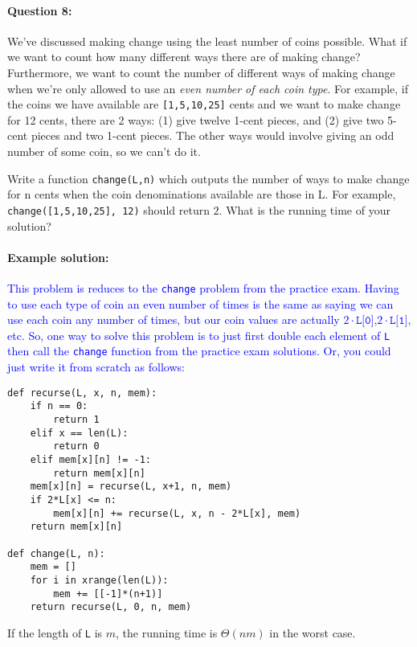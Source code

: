 \documentclass[11pt]{article}
\newcommand{\sol}[1]{\textcolor{blue}{#1}}
\begin{document}
\newpage

\paragraph{Question 8:}
We've discussed making change using the least number of coins
possible.  What if we want to count how many different ways there are
of making change?  
Furthermore, we want to count the number of different ways of making
change when we're only allowed to use an {\em even number of each coin
  type}.
For example, if the coins we have available are
\texttt{[1,5,10,25]} cents and we want to make change for 12 cents, there are 2
ways: (1) give twelve 1-cent pieces,  and (2) give two 5-cent pieces and
two 1-cent pieces.  The other ways would involve giving an odd number
of some coin, so we can't do it.

Write a function \texttt{change(L,n)} which outputs the number of
ways to make change for n cents when the coin denominations available
are those in L.  For example, \texttt{change([1,5,10,25], 12)} should
return $2$.  What is the running time of your solution?  

\paragraph{Example solution:}
\sol{This problem is reduces to the \texttt{change}
  problem from the practice exam.  Having to use each type of coin an
  even number of times is the same as saying we can use each coin any
  number of times, but our coin values are actually
  $2\cdot\texttt{L[0]}$,$2\cdot\texttt{L[1]}$, etc.  So, one way to
  solve this problem is to just first double each element of
  \texttt{L} then call the \texttt{change} function from the practice
  exam solutions.  Or, you could just write it from scratch as
  follows:}

\begin{verbatim}
def recurse(L, x, n, mem):
    if n == 0:
        return 1
    elif x == len(L):
        return 0
    elif mem[x][n] != -1:
        return mem[x][n]
    mem[x][n] = recurse(L, x+1, n, mem)
    if 2*L[x] <= n:
        mem[x][n] += recurse(L, x, n - 2*L[x], mem)
    return mem[x][n]

def change(L, n):
    mem = []
    for i in xrange(len(L)):
        mem += [[-1]*(n+1)]
    return recurse(L, 0, n, mem)
\end{verbatim}

If the length of \texttt{L} is $m$, the running time is $\Theta(nm)$
in the worst case.
\end{document}
